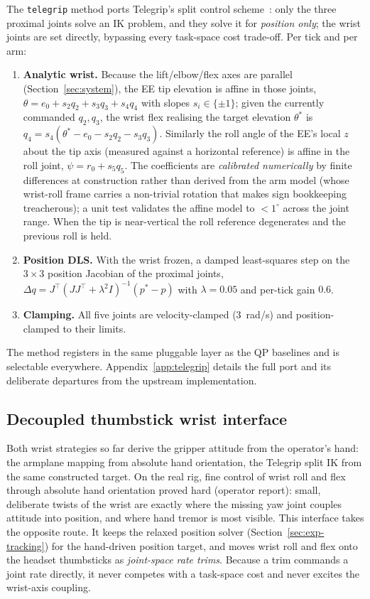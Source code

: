 The \texttt{telegrip} method ports Telegrip's split control
scheme~\citep{telegrip}: only the three proximal joints solve an IK
problem, and they solve it for \emph{position only}; the wrist joints
are set directly, bypassing every task-space cost trade-off. Per tick
and per arm:
\begin{enumerate}
  \item \textbf{Analytic wrist.} Because the lift/elbow/flex axes are
  parallel (Section~\ref{sec:system}), the EE tip elevation is affine in
  those joints,
  \(\theta = e_0 + s_2 q_2 + s_3 q_3 + s_4 q_4\) with slopes
  \(s_i\in\{\pm1\}\); given the currently commanded \(q_2,q_3\), the
  wrist flex realising the target elevation \(\theta^\ast\) is
  \(q_4 = s_4(\theta^\ast - e_0 - s_2 q_2 - s_3 q_3)\). Similarly the
  roll angle of the EE's local \(z\) about the tip axis (measured
  against a horizontal reference) is affine in the roll joint,
  \(\psi = r_0 + s_5 q_5\). The coefficients are \emph{calibrated
  numerically} by finite differences at construction rather than derived
  from the arm model (whose wrist-roll frame carries a non-trivial
  rotation that makes sign bookkeeping treacherous); a unit test
  validates the affine model to \(<1^\circ\) across the joint range.
  When the tip is near-vertical the roll reference degenerates and the
  previous roll is held.
  \item \textbf{Position DLS.} With the wrist frozen, a damped
  least-squares step on the \(3\times3\) position Jacobian of the
  proximal joints,
  \(\Delta q = J^\top (J J^\top + \lambda^2 I)^{-1}(p^\ast - p)\)
  with \(\lambda=0.05\) and per-tick gain \(0.6\).
  \item \textbf{Clamping.} All five joints are velocity-clamped
  (\SI{3}{rad/s}) and position-clamped to their limits.
\end{enumerate}
The method registers in the same pluggable layer as the QP baselines and
is selectable everywhere. Appendix~\ref{app:telegrip} details the full
port and its deliberate departures from the upstream implementation.

\subsection{Decoupled thumbstick wrist interface}
\label{sec:thumbstick}

Both wrist strategies so far derive the gripper attitude from the
operator's hand: the armplane mapping from absolute hand orientation, the
Telegrip split IK from the same constructed target. On the real rig, fine
control of wrist roll and flex through absolute hand orientation proved
hard (operator report): small, deliberate twists of the wrist are exactly
where the missing yaw joint couples attitude into position, and where
hand tremor is most visible. This interface takes the opposite route. It
keeps the relaxed position solver (Section~\ref{sec:exp-tracking}) for
the hand-driven position target, and moves wrist roll and flex onto the
headset thumbsticks as \emph{joint-space rate trims}. Because a trim
commands a joint rate directly, it never competes with a task-space cost
and never excites the wrist-axis coupling.

